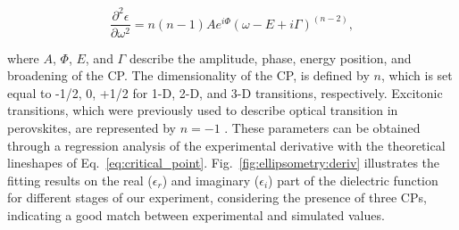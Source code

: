 \begin{equation}
    \frac{\partial ^2\epsilon}{\partial \omega^2} = n(n-1)Ae^{i\Phi}(\omega -E +i\Gamma)^{(n-2)},
    \label{eq:critical_point}
\end{equation}

where $A$, $\Phi$, $E$, and $\Gamma$ describe the amplitude, phase, energy position, and broadening of the CP. The dimensionality of the CP, is defined by $n$, which is set equal to -1/2, 0, +1/2 for 1-D, 2-D, and 3-D transitions, respectively. Excitonic transitions, which were previously used to describe optical transition in perovskites, are represented by $n=-1$ \cite{Jiang2016TemperatureEllipsometry, Ceratti2021CsPbBrsub3/subAir}. These parameters can be obtained through a regression analysis of the experimental derivative with the theoretical lineshapes of Eq.~\ref{eq:critical_point}. Fig.~\ref{fig:ellipsometry:deriv} illustrates the fitting results on the real ($\epsilon_r$) and imaginary ($\epsilon_i$) part of the dielectric function for different stages of our experiment, considering the presence of three CPs, indicating a good match between experimental and simulated values. 

